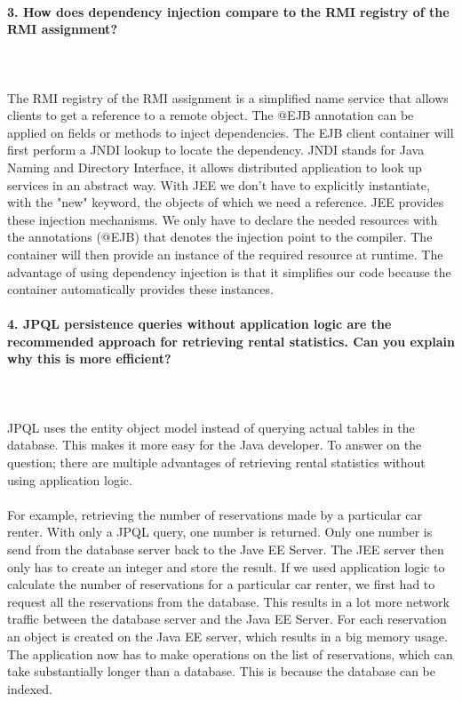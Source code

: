 \documentclass{ds-report}
\begin{document}
	\paragraph{3. How does dependency injection compare to the RMI registry of the RMI assignment?} \mbox{}\\\\
The RMI registry of the RMI assignment is a simplified name service that allows clients to get a reference to a remote object. The @EJB annotation can be applied on fields or methods to inject dependencies. The EJB client container will first perform a JNDI lookup to locate the dependency. JNDI stands for Java Naming and Directory Interface, it allows distributed application to look up services in an abstract way.
With JEE we don't have to explicitly instantiate, with the "new" keyword, the objects of which we need a reference. JEE provides these injection mechanisms. We only have to declare the needed resources with the annotations (@EJB) that denotes the injection point to the compiler. The container will then provide an instance of the required resource at runtime. The advantage of using dependency injection is that it simplifies our code because the container automatically provides these instances.


\clearpage



	\paragraph{4. JPQL persistence queries without application logic are the recommended approach for retrieving rental statistics. Can you explain why this is more efficient?} \mbox{}\\\\
JPQL uses the entity object model instead of querying actual tables in the database. This makes it more easy for the Java developer. To answer on the question; there are multiple advantages of retrieving rental statistics without using application logic.\\\\
For example, retrieving the number of reservations made by a particular car renter. With only a JPQL query, one number is returned. Only one number is send from the database server back to the Jave EE Server. The JEE server then only has to create an integer and store the result. If we used application logic to calculate the number of reservations for a particular car renter, we first had to request all the reservations from the database. This results in a lot more network traffic between the database server and the Java EE Server. For each reservation an object is created on the Java EE server, which results in a big memory usage. The application now has to make operations on the list of reservations, which can take substantially longer than a database. This is because the database can be indexed.
\end{document}
